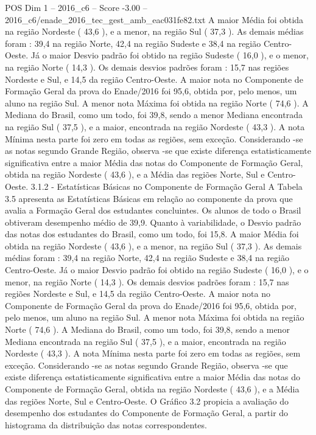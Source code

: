 \begin{textsample}{POS Dim 1 – 2016\_c6 – Score -3.00 – 2016\_c6/enade\_2016\_tec\_gest\_amb\_eac031fe82.txt}
A maior Média foi obtida na região Nordeste ( 43,6 ), e a menor, na região Sul ( 37,3 ).
As demais médias foram : 39,4 na região Norte, 42,4 na região Sudeste e 38,4 na região Centro-Oeste.
Já o maior Desvio padrão foi obtido na região Sudeste ( 16,0 ), e o menor, na região Norte ( 14,3 ).
Os demais desvios padrões foram : 15,7 nas regiões Nordeste e Sul, e 14,5 da região Centro-Oeste.
A maior nota no Componente de Formação Geral da prova do Enade/2016 foi 95,6, obtida por, pelo menos, um aluno na região Sul.
A menor nota Máxima foi obtida na região Norte ( 74,6 ).
A Mediana do Brasil, como um todo, foi 39,8, sendo a menor Mediana encontrada na região Sul ( 37,5 ), e a maior, encontrada na região Nordeste ( 43,3 ).
A nota Mínima nesta parte foi zero em todas as regiões, sem exceção.
Considerando -se as notas segundo Grande Região, observa -se que existe diferença estatisticamente significativa entre a maior Média das notas do Componente de Formação Geral, obtida na região Nordeste ( 43,6 ), e a Média das regiões Norte, Sul e Centro-Oeste. 3.1.2 - Estatísticas Básicas no Componente de Formação Geral A Tabela 3.5 apresenta as Estatísticas Básicas em relação ao componente da prova que avalia a Formação Geral dos estudantes concluintes.
Os alunos de todo o Brasil obtiveram desempenho médio de 39,9.
Quanto à variabilidade, o Desvio padrão das notas dos estudantes do Brasil, como um todo, foi 15,8.
A maior Média foi obtida na região Nordeste ( 43,6 ), e a menor, na região Sul ( 37,3 ).
As demais médias foram : 39,4 na região Norte, 42,4 na região Sudeste e 38,4 na região Centro-Oeste.
Já o maior Desvio padrão foi obtido na região Sudeste ( 16,0 ), e o menor, na região Norte ( 14,3 ).
Os demais desvios padrões foram : 15,7 nas regiões Nordeste e Sul, e 14,5 da região Centro-Oeste.
A maior nota no Componente de Formação Geral da prova do Enade/2016 foi 95,6, obtida por, pelo menos, um aluno na região Sul.
A menor nota Máxima foi obtida na região Norte ( 74,6 ).
A Mediana do Brasil, como um todo, foi 39,8, sendo a menor Mediana encontrada na região Sul ( 37,5 ), e a maior, encontrada na região Nordeste ( 43,3 ).
A nota Mínima nesta parte foi zero em todas as regiões, sem exceção.
Considerando -se as notas segundo Grande Região, observa -se que existe diferença estatisticamente significativa entre a maior Média das notas do Componente de Formação Geral, obtida na região Nordeste ( 43,6 ), e a Média das regiões Norte, Sul e Centro-Oeste.
O Gráfico 3.2 propicia a avaliação do desempenho dos estudantes do Componente de Formação Geral, a partir do histograma da distribuição das notas correspondentes.

\end{textsample}
